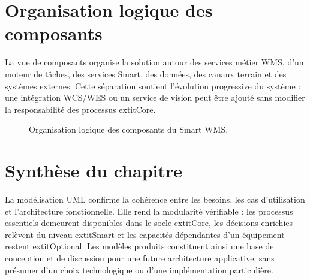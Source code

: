 \section{Organisation logique des composants}
\label{sec:5.6}

La vue de composants organise la solution autour des services métier WMS, d'un moteur de tâches, des services Smart, des données, des canaux terrain et des systèmes externes. Cette séparation soutient l'évolution progressive du système : une intégration WCS/WES ou un service de vision peut être ajouté sans modifier la responsabilité des processus 	extit{Core}.

\begin{figure}[p]
\centering
\resizebox{.92\linewidth}{!}{}
\caption{Organisation logique des composants du Smart WMS.}
\label{fig:composants}
\end{figure}
\FloatBarrier

\section{Synthèse du chapitre}
\label{sec:5.7}

La modélisation UML confirme la cohérence entre les besoins, les cas d'utilisation et l'architecture fonctionnelle. Elle rend la modularité vérifiable : les processus essentiels demeurent disponibles dans le socle 	extit{Core}, les décisions enrichies relèvent du niveau 	extit{Smart} et les capacités dépendantes d'un équipement restent 	extit{Optional}. Les modèles produits constituent ainsi une base de conception et de discussion pour une future architecture applicative, sans présumer d'un choix technologique ou d'une implémentation particulière.
